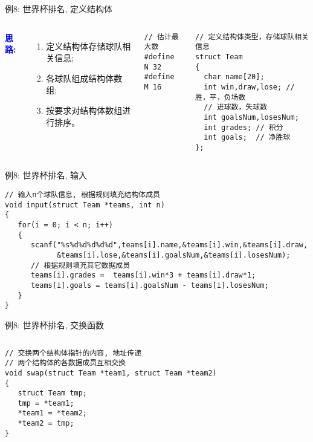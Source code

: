 \begin{frame}{例8: 世界杯排名, 定义结构体}
\begin{columns}[T]
\textbf{\textcolor{blue}{思路:}}
\begin{enumerate}
	\item 定义结构体存储球队相关信息;
	\item 各球队组成结构体数组;
	\item 按要求对结构体数组进行排序。
\end{enumerate}
\begin{lstlisting}
// 估计最大数 
#define N 32
#define M 16
\end{lstlisting}
\begin{lstlisting}
// 定义结构体类型，存储球队相关信息 
struct Team
{
  char name[20];
  int win,draw,lose; // 胜，平，负场数 
  // 进球数，失球数
  int goalsNum,losesNum; 
  int grades; // 积分
  int goals;  // 净胜球  
};
\end{lstlisting}
\end{columns}
\end{frame}

\begin{frame}{例8: 世界杯排名, 输入}
\begin{lstlisting}
// 输入n个球队信息, 根据规则填充结构体成员
void input(struct Team *teams, int n)
{
   for(i = 0; i < n; i++)
   {
      scanf("%s%d%d%d%d%d",teams[i].name,&teams[i].win,&teams[i].draw,
      		&teams[i].lose,&teams[i].goalsNum,&teams[i].losesNum);
      // 根据规则填充其它数据成员
      teams[i].grades =  teams[i].win*3 + teams[i].draw*1;
      teams[i].goals = teams[i].goalsNum - teams[i].losesNum; 
   }
}
\end{lstlisting}
\end{frame}

\begin{frame}{例8: 世界杯排名, 交换函数}
\begin{columns}[T]
\begin{lstlisting}
// 交换两个结构体指针的内容, 地址传递
// 两个结构体的各数据成员互相交换 
void swap(struct Team *team1, struct Team *team2)
{
   struct Team tmp;
   tmp = *team1; 
   *team1 = *team2; 
   *team2 = tmp;
}
\end{lstlisting}
\end{columns}
\medskip
\end{frame}

